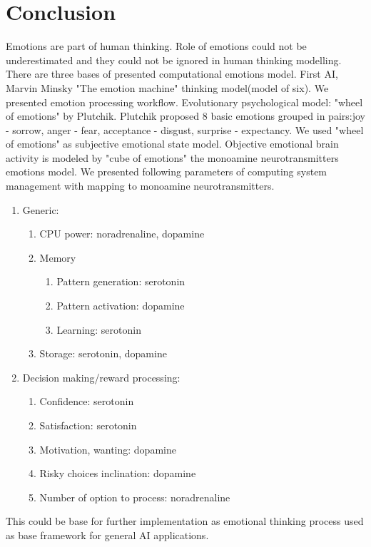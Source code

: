 \section{Conclusion}

Emotions are part of human thinking. Role of emotions could not be underestimated and they could not be ignored in human thinking modelling.
There are three bases of presented computational emotions model. First AI, Marvin Minsky "The emotion machine"\cite{emotionmachine} thinking model(model of six). We presented emotion processing workflow. Evolutionary psychological model: "wheel of emotions" by Plutchik\cite{natureofemotions}. Plutchik proposed 8 basic emotions grouped in pairs:joy - sorrow, anger - fear, acceptance - disgust, surprise - expectancy. We used "wheel of emotions" as subjective emotional state model. Objective emotional brain activity is modeled by "cube of emotions" the monoamine neurotransmitters emotions model. We presented following parameters of computing system management with mapping to monoamine neurotransmitters.

\begin{enumerate}
\item  Generic:
\begin{enumerate}
\item  CPU power: noradrenaline, dopamine
\item  Memory
\begin{enumerate}
\item  Pattern generation: serotonin
\item  Pattern activation: dopamine
\item  Learning: serotonin
\end{enumerate}
\item  Storage: serotonin, dopamine
\end{enumerate}
\item  Decision making/reward processing:
\begin{enumerate}
\item  Confidence: serotonin
\item  Satisfaction: serotonin
\item  Motivation, wanting: dopamine
\item  Risky choices inclination: dopamine
\item  Number of option to process: noradrenaline
\end{enumerate}
\end{enumerate}

This could be base for further implementation as emotional thinking process used as base framework for general AI applications.


